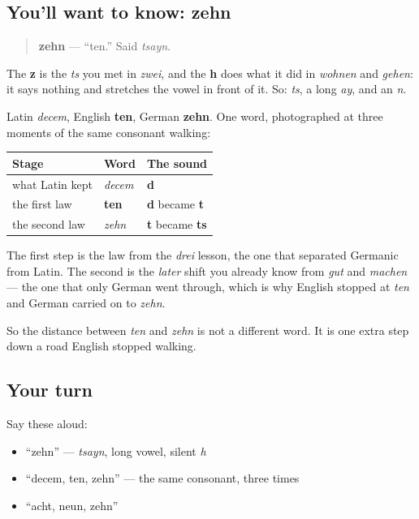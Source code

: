 \subsection*{You'll want to know: zehn}
\begin{quote}
\textbf{zehn} — \textquotedblleft{}ten.\textquotedblright{} Said \emph{tsayn}.
\end{quote}

The \textbf{z} is the \emph{ts} you met in \emph{zwei}, and the \textbf{h} does what it did in \emph{wohnen} and \emph{gehen}: it says nothing and stretches the vowel in front of it. So: \emph{ts}, a long \emph{ay}, and an \emph{n}.

\begin{cousinweb}
Latin \emph{decem}, English \textbf{ten}, German \textbf{zehn}. One word, photographed at three moments of the same consonant walking:

\noindent
\begin{tabularx}{\linewidth}{@{}>{\raggedright\arraybackslash}X>{\raggedright\arraybackslash}X>{\raggedright\arraybackslash}X@{}}
\toprule
\textbf{Stage} & \textbf{Word} & \textbf{The sound} \\
\midrule
what Latin kept & \emph{decem} & \textbf{d} \\
the first law & \textbf{ten} & \textbf{d} became \textbf{t} \\
the second law & \emph{zehn} & \textbf{t} became \textbf{ts} \\
\bottomrule
\end{tabularx}

The first step is the law from the \emph{drei} lesson, the one that separated Germanic from Latin. The second is the \emph{later} shift you already know from \emph{gut} and \emph{machen} — the one that only German went through, which is why English stopped at \emph{ten} and German carried on to \emph{zehn}.

So the distance between \emph{ten} and \emph{zehn} is not a different word. It is one extra step down a road English stopped walking.
\end{cousinweb}

\subsection*{Your turn}
Say these aloud:

\begin{itemize}
\raggedright
  \item \textquotedblleft{}zehn\textquotedblright{} — \emph{tsayn}, long vowel, silent \emph{h}
  \item \textquotedblleft{}decem, ten, zehn\textquotedblright{} — the same consonant, three times
  \item \textquotedblleft{}acht, neun, zehn\textquotedblright{}
\end{itemize}

